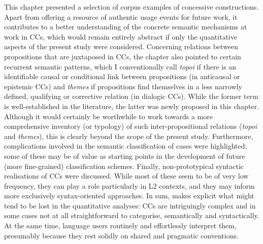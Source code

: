 This chapter presented a selection of corpus examples of concessive constructions. Apart from offering a resource of authentic usage events for future work, it contributes to a better understanding of the concrete semantic mechanisms at work in CCs, which would remain entirely abstract if only the quantitative aspects of the present study were considered.  Concerning relations between propositions that are juxtaposed in CCs, the chapter also pointed to certain recurrent semantic patterns, which I conventionally call \textit{topoi} if there is an identifiable causal or conditional link between propositions (in anticausal or epistemic CCs) and \textit{themes} if propositions find themselves in a less narrowly defined, qualifying or corrective relation (in dialogic CCs). While the former term is well-established in the literature, the latter was newly proposed in this chapter. Although it would certainly be worthwhile to work towards a more comprehensive inventory (or typology) of such inter-propositional relations (\textit{topoi} and \textit{themes}), this is clearly beyond the scope of the present study. Furthermore, complications involved in the semantic classification of cases were highlighted; some of these may be of value as starting points in the development of future (more fine-grained) classification schemes. Finally, non-prototypical syntactic realisations of CCs were discussed. While most of these seem to be of very low frequency, they can play a role particularly in L2 contexts, and they may inform more exclusively syntax-oriented approaches. In sum,  makes explicit what might tend to be lost in the quantitative analyses: CCs are intriguingly complex and in some cases not at all straightforward to categorise, semantically and syntactically. At the same time, language users routinely and effortlessly interpret them, presumably because they rest solidly on shared  and pragmatic conventions.
